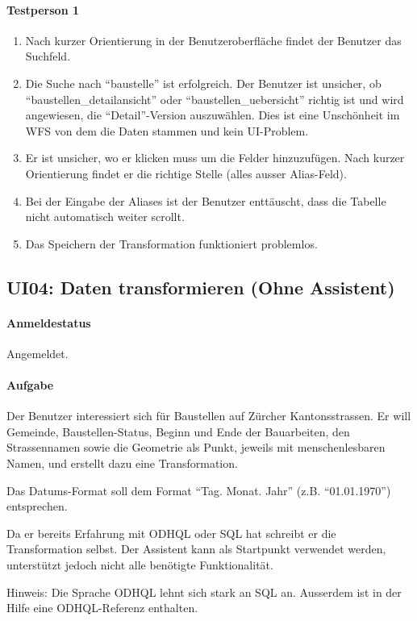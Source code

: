 \paragraph{Testperson 1}
\begin{enumerate}
\item Nach kurzer Orientierung in der Benutzeroberfläche findet der Benutzer das Suchfeld.
\item Die Suche nach ``baustelle'' ist erfolgreich. Der Benutzer ist unsicher, ob ``baustellen\_detailansicht'' oder ``baustellen\_uebersicht'' richtig ist und wird angewiesen, die ``Detail''-Version auszuwählen. Dies ist eine Unschönheit im WFS von dem die Daten stammen und kein UI-Problem.
\item Er ist unsicher, wo er klicken muss um die Felder hinzuzufügen. Nach kurzer Orientierung findet er die richtige Stelle (alles ausser Alias-Feld).
\item Bei der Eingabe der Aliases ist der Benutzer enttäuscht, dass die Tabelle nicht automatisch weiter scrollt. 
\item Das Speichern der Transformation funktioniert problemlos.
\end{enumerate}

\subsection{UI04: Daten transformieren (Ohne Assistent)}
\paragraph{Anmeldestatus} Angemeldet.

\paragraph{Aufgabe} Der Benutzer interessiert sich für Baustellen auf Zürcher Kantonsstrassen. Er will Gemeinde, Baustellen-Status, Beginn und Ende der Bauarbeiten, den Strassennamen sowie die Geometrie als Punkt, jeweils mit menschenlesbaren Namen, und erstellt dazu eine Transformation.

Das Datums-Format soll dem Format ``Tag. Monat. Jahr'' (z.B. ``01.01.1970'') entsprechen.

Da er bereits Erfahrung mit ODHQL oder SQL hat schreibt er die Transformation selbst. Der Assistent kann als Startpunkt verwendet werden, unterstützt jedoch nicht alle benötigte Funktionalität.

Hinweis: Die Sprache ODHQL lehnt sich stark an SQL an. Ausserdem ist in der Hilfe eine ODHQL-Referenz enthalten.

